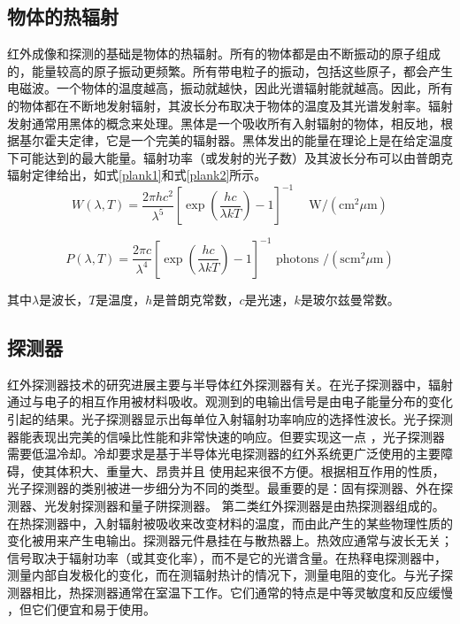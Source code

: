 \subsection{物体的热辐射}
红外成像和探测的基础是物体的热辐射。所有的物体都是由不断振动的原子组成的，能量较高的原子振动更频繁。所有带电粒子的振动，包括这些原子，都会产生电磁波。一个物体的温度越高，振动就越快，因此光谱辐射能就越高。因此，所有的物体都在不断地发射辐射，其波长分布取决于物体的温度及其光谱发射率。辐射发射通常用黑体的概念来处理。黑体是一个吸收所有入射辐射的物体，相反地，根据基尔霍夫定律，它是一个完美的辐射器。黑体发出的能量在理论上是在给定温度下可能达到的最大能量。辐射功率（或发射的光子数）及其波长分布可以由普朗克辐射定律给出，如式\ref{plank1}和式\ref{plank2}所示。
\begin{equation}
    W(\lambda, T)=\frac{2 \pi h c^{2}}{\lambda^{5}}\left[\exp \left(\frac{h c}{\lambda k T}\right)-1\right]^{-1} \quad \mathrm{~W} /\left(\mathrm{cm}^{2} \mu \mathrm{m}\right)
    \label{plank1}
\end{equation}

\begin{equation}
    P(\lambda, T)=\frac{2 \pi c}{\lambda^{4}}\left[\exp \left(\frac{h c}{\lambda k T}\right)-1\right]^{-1} \text { photons } /\left(\mathrm{s} \mathrm{cm}^{2} \mu \mathrm{m}\right)
    \label{plank2}    
\end{equation}

其中$\lambda$是波长，$T$是温度，$h$是普朗克常数，$c$是光速，$k$是玻尔兹曼常数。

\subsection{探测器}
红外探测器技术的研究进展主要与半导体红外探测器有关。在光子探测器中，辐射通过与电子的相互作用被材料吸收。观测到的电输出信号是由电子能量分布的变化引起的结果。光子探测器显示出每单位入射辐射功率响应的选择性波长。光子探测器能表现出完美的信噪比性能和非常快速的响应。但要实现这一点
，光子探测器需要低温冷却。冷却要求是基于半导体光电探测器的红外系统更广泛使用的主要障碍，使其体积大、重量大、昂贵并且
使用起来很不方便。根据相互作用的性质，光子探测器的类别被进一步细分为不同的类型。最重要的是：固有探测器、外在探测器、光发射探测器和量子阱探测器。
第二类红外探测器是由热探测器组成的。在热探测器中，入射辐射被吸收来改变材料的温度，而由此产生的某些物理性质的变化被用来产生电输出。探测器元件悬挂在与散热器上。热效应通常与波长无关；信号取决于辐射功率（或其变化率），而不是它的光谱含量。在热释电探测器中，测量内部自发极化的变化，而在测辐射热计的情况下，测量电阻的变化。与光子探测器相比，热探测器通常在室温下工作。它们通常的特点是中等灵敏度和反应缓慢
，但它们便宜和易于使用。

